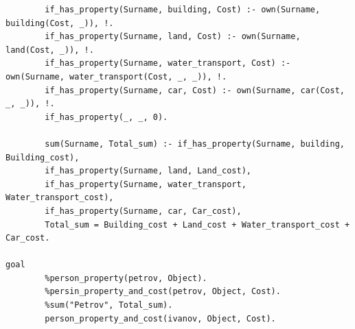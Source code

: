 \documentclass[12pt,a4paper]{scrreprt}
\begin{document}
\begin{lstlisting}
		if_has_property(Surname, building, Cost) :- own(Surname, building(Cost, _)), !.
		if_has_property(Surname, land, Cost) :- own(Surname, land(Cost, _)), !.
		if_has_property(Surname, water_transport, Cost) :- own(Surname, water_transport(Cost, _, _)), !.
		if_has_property(Surname, car, Cost) :- own(Surname, car(Cost, _, _)), !.
		if_has_property(_, _, 0).
		
		sum(Surname, Total_sum) :- if_has_property(Surname, building, Building_cost), 
		if_has_property(Surname, land, Land_cost),
		if_has_property(Surname, water_transport, Water_transport_cost),
		if_has_property(Surname, car, Car_cost),
		Total_sum = Building_cost + Land_cost + Water_transport_cost + Car_cost.

goal
		%person_property(petrov, Object).
		%persin_property_and_cost(petrov, Object, Cost).
		%sum("Petrov", Total_sum).
		person_property_and_cost(ivanov, Object, Cost).
\end{lstlisting}

%
\end{document}
